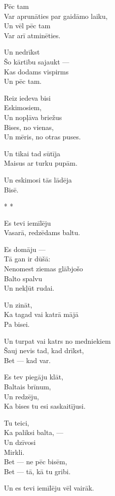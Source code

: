 \documentclass[14pt]{extarticle}
\begin{document}
Pēc tam\\
Var aprunāties par gaidāmo laiku,\\
Un vēl pēc tam\\
Var arī atminēties.

Un nedrīkst\\
Šo kārtību sajaukt ---\\
Kas dodams vispirms\\
Un pēc tam.

Reiz iedeva bisi\\
Eskimosiem,\\
Un nopļāva briežus\\
Bises, no vienas,\\
Un mēris, no otras puses.

Un tikai tad sūtīja\\
Maisus ar turku pupām.

Un eskimosi tās lādēja\\
Bisē.


\newpage

{\large \sc * * *}

Es tevi iemīlēju\\
Vasarā, redzēdams baltu.

Es domāju ---\\
Tā gan ir dūšā:\\
Nenomest ziemas glābjošo\\
Balto spalvu\\
Un nekļūt rudai.

Un zināt,\\
Ka tagad vai katrā mājā\\
Pa bisei.

Un turpat vai katrs no medniekiem\\
Šauj nevis tad, kad drīkst,\\
Bet --- kad var.

Es tev piegāju klāt,\\
Baltais brīnum,\\
Un redzēju,\\
Ka bises tu esi saskaitījusi.

Tu teici,\\
Ka paliksi balta, ---\\
Un dzīvosi\\
Mirkli.\\
Bet --- ne pēc bisēm,\\
Bet --- tā, kā tu gribi.

Un es tevi iemīlēju vēl vairāk.


\newpage
\end{document}
